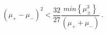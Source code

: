 \begin{equation}
(\mu_+-\mu_-)^2<\frac{32}{27}\frac{ min\left\{\mu_{\pm}^3\right\}}
{(\mu_++\mu_-)}\,.\end{equation}

